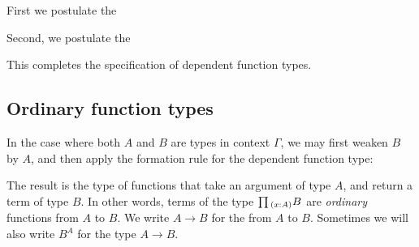 First we postulate the 
\begin{prooftree}
\end{prooftree}
Second, we postulate the 
\begin{prooftree}
\end{prooftree}
This completes the specification of dependent function types.

\subsection{Ordinary function types}
In the case where both $A$ and $B$ are types in context $\Gamma$, we may first weaken $B$ by $A$, and then apply the formation rule for the dependent function type:
\begin{prooftree}
\end{prooftree}
The result is the type of functions that take an argument of type $A$, and return a term of type $B$. In other words, terms of the type $\prd{x:A}B$ are \emph{ordinary} functions from $A$ to $B$. We write $A\to B$ for the  from $A$ to $B$. Sometimes we will also write $B^A$ for the type $A\to B$.

